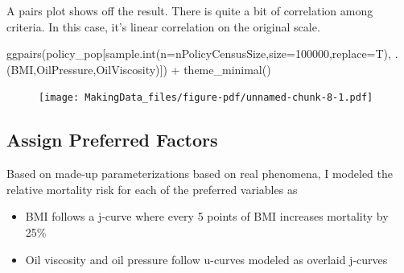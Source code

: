 \documentclass[
  letterpaper,
  DIV=11,
  numbers=noendperiod]{scrartcl}
\newenvironment{Shaded}{\begin{snugshade}}{\end{snugshade}}
\newcommand{\AttributeTok}[1]{\textcolor[rgb]{0.40,0.45,0.13}{#1}}
\newcommand{\DecValTok}[1]{\textcolor[rgb]{0.68,0.00,0.00}{#1}}
\newcommand{\FunctionTok}[1]{\textcolor[rgb]{0.28,0.35,0.67}{#1}}
\newcommand{\NormalTok}[1]{\textcolor[rgb]{0.00,0.23,0.31}{#1}}
\newcommand{\SpecialCharTok}[1]{\textcolor[rgb]{0.37,0.37,0.37}{#1}}
\providecommand{\tightlist}{%
  \setlength{\itemsep}{0pt}\setlength{\parskip}{0pt}}\usepackage{longtable,booktabs,array}
\begin{document}
A pairs plot shows off the result. There is quite a bit of correlation
among criteria. In this case, it's linear correlation on the original
scale.

\begin{Shaded}
\begin{Highlighting}[]
\FunctionTok{ggpairs}\NormalTok{(policy\_pop[}\FunctionTok{sample.int}\NormalTok{(}\AttributeTok{n=}\NormalTok{nPolicyCensusSize,}\AttributeTok{size=}\DecValTok{100000}\NormalTok{,}\AttributeTok{replace=}\NormalTok{T),}
\NormalTok{                   .(BMI,OilPressure,OilViscosity)]) }\SpecialCharTok{+}
  \FunctionTok{theme\_minimal}\NormalTok{()}
\end{Highlighting}
\end{Shaded}

\begin{figure}[H]

{\centering \texttt{[image: MakingData\_files/figure-pdf/unnamed-chunk-8-1.pdf]}

}

\end{figure}

\hypertarget{assign-preferred-factors}{%
\subsection{Assign Preferred Factors}\label{assign-preferred-factors}}

Based on made-up parameterizations based on real phenomena, I modeled
the relative mortality risk for each of the preferred variables as

\begin{itemize}
\tightlist
\item
  BMI follows a j-curve where every 5 points of BMI increases mortality
  by 25\%
\item
  Oil viscosity and oil pressure follow u-curves modeled as overlaid
  j-curves
\end{itemize}
\end{document}
